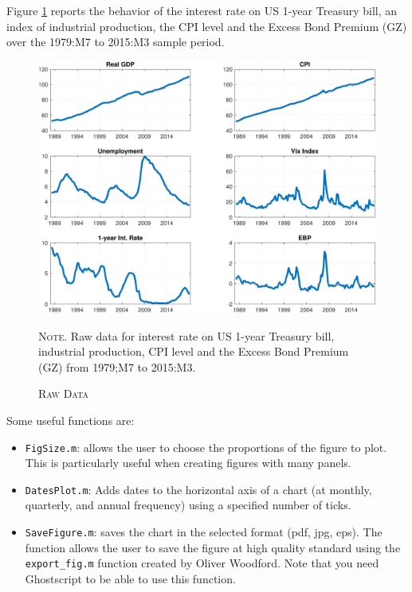 \documentclass[10pt]{article}
\begin{document}
Figure \ref{fig:DATA_GK} reports the behavior of the interest rate on US
1-year Treasury bill, an index of industrial production, the CPI level and
the Excess Bond Premium (GZ) over the 1979:M7 to 2015:M3 sample period.

\begin{figure}[th]
\centering%
\begin{minipage}[b]{.9\textwidth}
\caption{\scshape{Raw Data}}\vspace{0.1cm}
\begin{center}
\includegraphics[width=\textwidth]{DATA_GK}
\end{center}%
\footnotesize{{\scshape Note.} Raw data for interest rate on US 1-year Treasury bill, industrial production, CPI level and the Excess Bond Premium (GZ) from 1979;M7 to 2015:M3.}
\label{fig:DATA_GK}
\end{minipage}
\end{figure}

Some useful functions are:

\begin{itemize}
\item \texttt{FigSize.m}: allows the user to choose the proportions of the
figure to plot. This is particularly useful when creating figures with many
panels.

\item \texttt{DatesPlot.m}: Adds dates to the horizontal axis of a chart (at
monthly, quarterly, and annual frequency) using a specified number of ticks.

\item \texttt{SaveFigure.m}: saves the chart in the selected format (pdf,
jpg, eps). The function allows the user to save the figure at high quality
standard using the \texttt{export\_fig.m} function created by Oliver
Woodford. Note that you need Ghostscript to be able to use this function.
\end{itemize}
\end{document}
